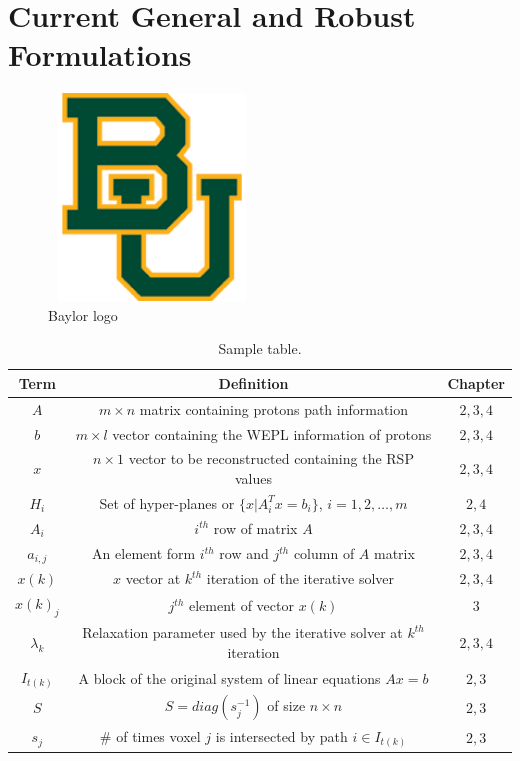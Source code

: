 \chapter{Current General and Robust Formulations}

\begin{figure}[H]
\centering
\includegraphics[width=5.5cm,height=5.5cm]{baylor.png}
\vspace{-3mm}
\caption[Baylor logo]{Baylor logo}
\label{fig:1}
\end{figure}




\begin{table}[th]
\caption{Sample table.}
\label{t:1}
\centering
\begin{tabular}{ccc}
\hline
Term & Definition & Chapter  \\ \hline
$A$ & $m \times n$ matrix containing protons path information & $2,3,4$\\    
$b$ & $m \times l$ vector containing the WEPL information of protons& $2,3,4$ \\ 
$x$ & $n \times 1$ vector to be reconstructed containing the RSP values & $2,3,4$ \\    
$H_i$ & Set of hyper-planes or $\{ x | A_i^T x = b_i \}$, $i = 1, 2, \dots, m$ & $2,4$ \\
$A_i$ & $i^{th}$ row of  matrix $A$ & $2,3,4$ \\    
$a_{i,j}$ & An element form $i^{th}$ row and $j^{th}$ column of $A$ matrix  & $2,3,4$ \\    
$x(k)$ & $x$ vector at $k^{th}$ iteration of the iterative solver & $2,3,4$ \\   
${x(k)}_j$ & $j^{th}$ element of vector $x(k)$  & $3$ \\
$\lambda_k$ & Relaxation parameter used by the iterative solver at $k^{th}$ iteration & $2,3,4$ \\ 
$I_{t(k)}$ & A block of the original system of linear equations $Ax = b$ & $2,3$\\
$S$ & $S = diag(s_j^{-1})$ of size $n \times n$ & $2,3$ \\ 
$s_j$ &  $\#$ of times voxel $j$ is intersected by path $i \in I_{t(k)}$ & $2,3$ \\ \hline
\end{tabular}
\end{table}

